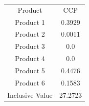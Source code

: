 \begin{tabular}{cc}
Product & CCP \\
Product 1 & 0.3929 \\
Product 2 & 0.0011 \\
Product 3 & 0.0 \\
Product 4 & 0.0 \\
Product 5 & 0.4476 \\
Product 6 & 0.1583 \\
Inclusive Value & 27.2723 \\
\end{tabular}